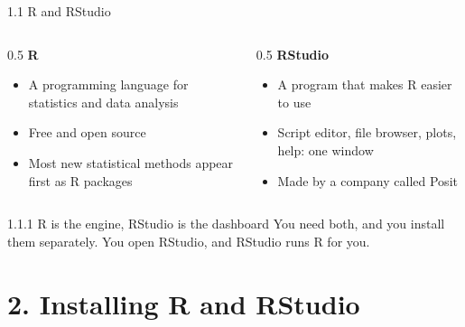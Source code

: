 \documentclass[
  ignorenonframetext,
  aspectratio=169,
]{beamer}
\providecommand{\tightlist}{%
  \setlength{\itemsep}{0pt}\setlength{\parskip}{0pt}}
\begin{document}
\begin{frame}{1.1 R and RStudio}
\protect{}\label{r-and-rstudio}
\begin{columns}[T]
\begin{column}{0.5\linewidth}
\textbf{R}

\begin{itemize}
\tightlist
\item
  A programming language for statistics and data analysis
\item
  Free and open source
\item
  Most new statistical methods appear first as R packages
\end{itemize}
\end{column}

\begin{column}{0.5\linewidth}
\textbf{RStudio}

\begin{itemize}
\tightlist
\item
  A program that makes R easier to use
\item
  Script editor, file browser, plots, help: one window
\item
  Made by a company called Posit
\end{itemize}
\end{column}
\end{columns}

\begin{exampleblock}{1.1.1 R is the engine, RStudio is the dashboard}
\protect{}\label{r-is-the-engine-rstudio-is-the-dashboard}
You need both, and you install them separately. You open RStudio, and
RStudio runs R for you.
\end{exampleblock}
\end{frame}

\section{2. Installing R and RStudio}\label{sec-install}
\end{document}
